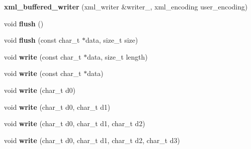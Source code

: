 \begin{DoxyCompactItemize}
\item 
\hypertarget{classxml__buffered__writer_a3c22ad246e2aebb6597935baf4a223a7}{{\bfseries xml\-\_\-buffered\-\_\-writer} (xml\-\_\-writer \&writer\-\_\-, xml\-\_\-encoding user\-\_\-encoding)}\label{classxml__buffered__writer_a3c22ad246e2aebb6597935baf4a223a7}

\item 
\hypertarget{classxml__buffered__writer_a74192d6bbee5ea387377537ede483b4f}{void {\bfseries flush} ()}\label{classxml__buffered__writer_a74192d6bbee5ea387377537ede483b4f}

\item 
\hypertarget{classxml__buffered__writer_aa733cb2cd0d5fcacec92c67a7f26c553}{void {\bfseries flush} (const char\-\_\-t $\ast$data, size\-\_\-t size)}\label{classxml__buffered__writer_aa733cb2cd0d5fcacec92c67a7f26c553}

\item 
\hypertarget{classxml__buffered__writer_af830f04deffd7e28122d8c8973707c94}{void {\bfseries write} (const char\-\_\-t $\ast$data, size\-\_\-t length)}\label{classxml__buffered__writer_af830f04deffd7e28122d8c8973707c94}

\item 
\hypertarget{classxml__buffered__writer_af4181dcf2610619ba4f35d86c3d66372}{void {\bfseries write} (const char\-\_\-t $\ast$data)}\label{classxml__buffered__writer_af4181dcf2610619ba4f35d86c3d66372}

\item 
\hypertarget{classxml__buffered__writer_a1aa829bd551a69dd9005d2d46063308f}{void {\bfseries write} (char\-\_\-t d0)}\label{classxml__buffered__writer_a1aa829bd551a69dd9005d2d46063308f}

\item 
\hypertarget{classxml__buffered__writer_a4cd6e908908e17c9b07eba34f7317791}{void {\bfseries write} (char\-\_\-t d0, char\-\_\-t d1)}\label{classxml__buffered__writer_a4cd6e908908e17c9b07eba34f7317791}

\item 
\hypertarget{classxml__buffered__writer_af82b277c1ef5c75d1901bb5a8eb4507f}{void {\bfseries write} (char\-\_\-t d0, char\-\_\-t d1, char\-\_\-t d2)}\label{classxml__buffered__writer_af82b277c1ef5c75d1901bb5a8eb4507f}

\item 
\hypertarget{classxml__buffered__writer_af679f459dfa0af257c190b8db57e7dcb}{void {\bfseries write} (char\-\_\-t d0, char\-\_\-t d1, char\-\_\-t d2, char\-\_\-t d3)}\label{classxml__buffered__writer_af679f459dfa0af257c190b8db57e7dcb}


\end{DoxyCompactItemize}
